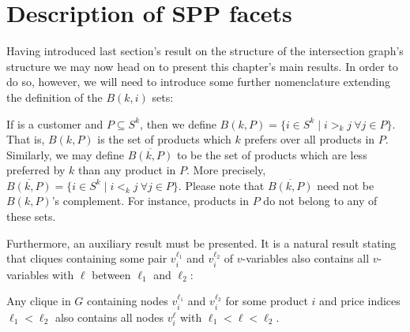 \section{Description of SPP facets} %
\label{sec:spp:facets}

Having introduced last section's result on the structure of the intersection
graph's structure we may now head on to present this chapter's main results. In
order to do so, however, we will need to introduce some further nomenclature
extending the definition of the $B(k, i)$ sets:

\begin{definition}
    \label{def:better-set}

    If \kk is a customer and $P \subseteq S^k$, then we define
    $
        B(k, P) = \{ i \in S^k \mid i >_k j\ \forall j \in P\}
    $.
    That is, $B(k, P)$ is the set of products which $k$ prefers over all
    products in $P$. Similarly, we may define $\overline{B(k, P)}$ to be the set
    of products which are less preferred by $k$ than any product in $P$. More
    precisely,
    $
        \overline{B(k, P)} = \{ i \in S^k \mid i <_k j\ \forall j \in P\}
    $.
    Please note that $\overline{B(k, P)}$ need not be $B(k, P)$'s complement.
    For instance, products in $P$ do not belong to any of these sets.
\end{definition}

Furthermore, an auxiliary result must be presented. It is a natural result
stating that cliques containing some pair $v_i^{\ell_1}$ and $v_i^{\ell_2}$ of
$v$-variables also contains all $v$-variables with $\ell$ between $\ell_1$ and
$\ell_2$:

\begin{lemma}
    \label{lem:price-index-interval}

    Any clique in $G$ containing nodes $v_i^{\ell_1}$ and $v_i^{\ell_2}$ for
    some product $i$ and price indices $\ell_1 < \ell_2$ also contains all nodes
    $v_i^\ell$ with $\ell_1 < \ell < \ell_2$.
\end{lemma}


